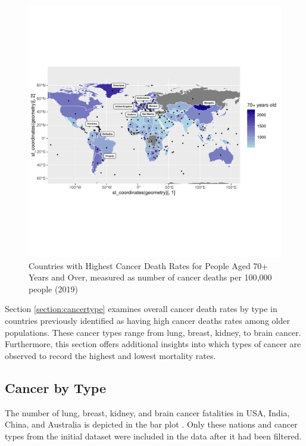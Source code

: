 \documentclass[11pt,a4paper,]{article}
\begin{document}
\begin{figure}
\centering
\includegraphics{etc5513_assignment2_g1_t1_files/figure-latex/figure2-1.pdf}
\caption{\label{fig:figure2}Countries with Highest Cancer Death Rates for People Aged 70+ Years and Over, measured as number of cancer deaths per 100,000 people (2019)}
\end{figure}

Section \ref{section:cancertype} examines overall cancer death rates by type in countries previously identified as having high cancer deaths rates among older populations. These cancer types range from lung, breast, kidney, to brain cancer. Furthermore, this section offers additional insights into which types of cancer are observed to record the highest and lowest mortality rates.

\hypertarget{cancer-by-type-1}{%
\subsection{\texorpdfstring{Cancer by Type \label{section:cancertype}}{Cancer by Type }}\label{cancer-by-type-1}}

The number of lung, breast, kidney, and brain cancer fatalities in USA, India, China, and Australia is depicted in the bar plot . Only these nations and cancer types from the initial dataset were included in the data after it had been filtered.
\end{document}
